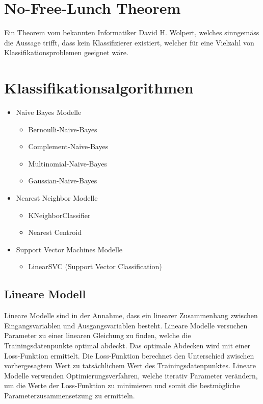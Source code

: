 \section{No-Free-Lunch Theorem}\label{sec:nofreelunch}
Ein Theorem vom bekannten Informatiker David H. Wolpert, welches sinngemäss die Aussage trifft, dass kein Klassifizierer existiert, welcher für eine Vielzahl von Klassifikationsproblemen geeignet wäre\cite[p.]{Wolpert1996TheLO}.

\section{Klassifikationsalgorithmen}	%
\begin{itemize}
	\item Naive Bayes Modelle
	\begin{itemize}
		\item Bernoulli-Naive-Bayes
		\item Complement-Naive-Bayes
		\item Multinomial-Naive-Bayes
		\item Gaussian-Naive-Bayes
	\end{itemize}
	\item Nearest Neighbor Modelle
	\begin{itemize}
		\item KNeighborClassifier
		\item Nearest Centroid
	\end{itemize}
	\item Support Vector Machines Modelle
	\begin{itemize}
		\item LinearSVC (Support Vector Classification)
	\end{itemize}
\end{itemize}
\subsection{Lineare Modell}
Lineare Modelle sind in der Annahme, dass ein linearer Zusammenhang zwischen Eingangsvariablen und Ausgangsvariablen besteht.
Lineare Modelle versuchen Parameter zu einer linearen Gleichung zu finden, welche die Trainingsdatenpunkte optimal abdeckt.
Das optimale Abdecken wird mit einer Loss-Funktion ermittelt.
Die Loss-Funktion berechnet den Unterschied zwischen vorhergesagtem Wert zu tatsächlichem Wert des Trainingsdatenpunktes.
Lineare Modelle verwenden Optimierungsverfahren, welche iterativ Parameter verändern, um die Werte der Loss-Funktion zu minimieren und somit die bestmögliche Parameterzusammensetzung zu ermitteln.
